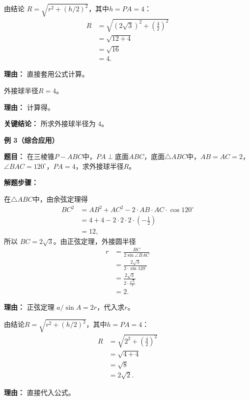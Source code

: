 \begin{examplebox}
\begin{description}[style=nextline, leftmargin=2.8em, labelsep=0.5em, itemsep=0.45em]
		\item[\textbf{第二步（代入公式）：}] 由结论 $R = \sqrt{r^{2} + (h/2)^{2}}$，其中$h=PA=4$：
			\[
				\begin{aligned}
					R &= \sqrt{(2\sqrt{3})^{2} + \left(\frac{4}{2}\right)^{2}} \\
					&= \sqrt{12 + 4} \\
					&= \sqrt{16} \\
					&= 4.
			\end{aligned}
			\]
			\par\textbf{理由：} 直接套用公式计算。

		\item[\textbf{第三步（写出答案）：}] 外接球半径$R = 4$。
			\par\textbf{理由：} 计算得。
	\end{description}

	\textbf{\textcolor{CExample}{关键结论：}}
	所求外接球半径为 $4$。

	\medskip
	\textbf{\textcolor{CExample}{例 3（综合应用）}}

	\textbf{\textcolor{CExample}{题目：}}
	在三棱锥$P-ABC$中，$PA\perp$底面$ABC$，底面$\triangle ABC$中，$AB=AC=2$，$\angle BAC=120^{\circ}$，$PA=4$，求外接球半径$R$。

	\textbf{\textcolor{CExample}{解题步骤：}}
	\begin{description}[style=nextline, leftmargin=2.8em, labelsep=0.5em, itemsep=0.45em]
		\item[\textbf{第一步（求底面外接圆半径）：}] 在$\triangle ABC$中，由余弦定理得
			\[
				\begin{aligned}
					BC^{2} &= AB^{2}+AC^{2}-2\cdot AB\cdot AC\cdot\cos 120^{\circ} \\
					&= 4+4-2\cdot2\cdot2\cdot\left(-\frac12\right) \\
					&= 12,
			\end{aligned}
			\]
			所以 $BC=2\sqrt{3}$。由正弦定理，外接圆半径
			\[
				\begin{aligned}
					r &= \frac{BC}{2\sin\angle BAC} \\
					&= \frac{2\sqrt{3}}{2\cdot\sin 120^{\circ}} \\
					&= \frac{2\sqrt{3}}{2\cdot\frac{\sqrt{3}}{2}} \\
					&= 2.
			\end{aligned}
			\]
			\par\textbf{理由：} 正弦定理 $a/\sin A = 2r$，代入求$r$。

		\item[\textbf{第二步（代入棱锥公式）：}] 由结论$R = \sqrt{r^{2} + (h/2)^{2}}$，其中$h=PA=4$：
			\[
				\begin{aligned}
					R &= \sqrt{2^{2} + \left(\frac{4}{2}\right)^{2}} \\
					&= \sqrt{4 + 4} \\
					&= \sqrt{8} \\
					&= 2\sqrt{2}.
			\end{aligned}
			\]
			\par\textbf{理由：} 直接代入公式。


\end{description}
\end{examplebox}
